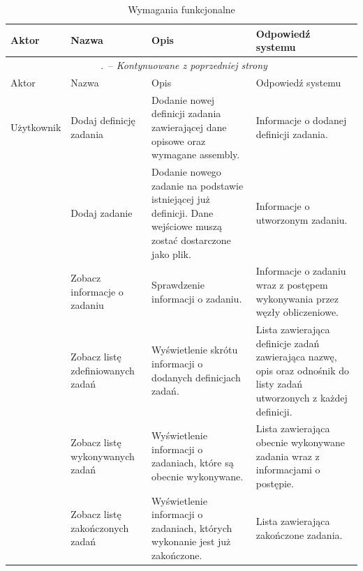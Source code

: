 \documentclass[a4paper,11pt,twoside]{report}
\renewcommand*{\thetable}{\arabic{chapter}.\arabic{table}}
\theoremstyle{definition}
\begin{document}
            \begin{longtable}{| p{} | p{} | p{} | p{} |}
                \caption{Wymagania funkcjonalne}
                \label{wymagania-funkcjonalne} \\
                \hline
                Aktor & Nazwa & Opis & Odpowiedź systemu \\ \hline
                \endfirsthead
                \multicolumn{4}{c}{\tablename\ \thetable\ -- \textit{Kontynuowane z poprzedniej strony}} \\
                \hline
                Aktor & Nazwa & Opis & Odpowiedź systemu \\ \hline
                \endhead
                
                Użytkownik
                & Dodaj definicję zadania
                & Dodanie nowej definicji zadania zawierającej dane opisowe oraz wymagane assembly.
                & Informacje o dodanej definicji zadania. \\ \cline{2-4} 
                
                & Dodaj zadanie
                & Dodanie nowego zadanie na podstawie istniejącej już definicji. Dane wejściowe muszą zostać dostarczone jako plik.
                & Informacje o utworzonym zadaniu. \\ \cline{2-4} 
                
                & Zobacz informacje o zadaniu
                & Sprawdzenie informacji o zadaniu.
                & Informacje o zadaniu wraz z postępem wykonywania przez węzły obliczeniowe. \\ \cline{2-4} 

                & Zobacz listę zdefiniowanych zadań
                & Wyświetlenie skrótu informacji o dodanych definicjach zadań.
                & Lista zawierająca definicje zadań zawierająca nazwę, opis oraz odnośnik do listy zadań utworzonych z każdej definicji. \\ \cline{2-4} 
                
                & Zobacz listę wykonywanych zadań   
                & Wyświetlenie informacji o zadaniach, które są obecnie wykonywane.                             
                & Lista zawierająca obecnie wykonywane zadania wraz z informacjami o postępie. \\ \cline{2-4} 
                
                & Zobacz listę zakończonych zadań  
                & Wyświetlenie informacji o zadaniach, których wykonanie jest już zakończone.
                & Lista zawierająca zakończone zadania. \\ \cline{2-4} 
                

\end{longtable}
\end{document}
